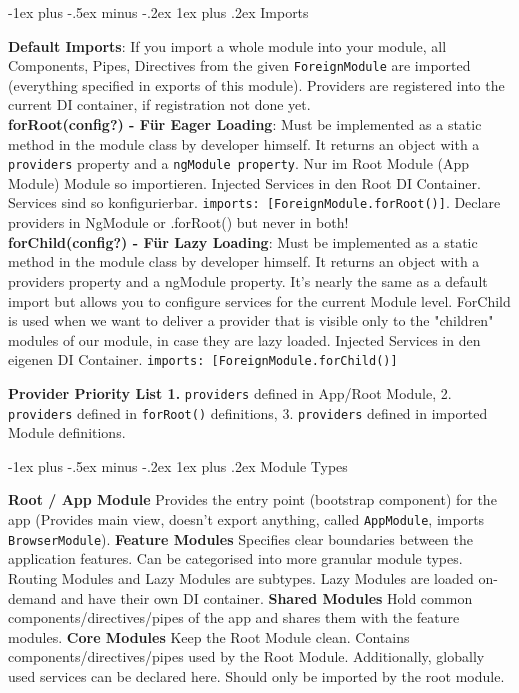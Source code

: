 \documentclass[a4paper, fontsize=6pt]{scrartcl}
\makeatletter
\renewcommand{\subsubsection}{\@startsection{subsubsection}{3}{0mm}%
    {-1ex plus -.5ex minus -.2ex}%
    {1ex plus .2ex}%
    {\normalfont\small\bfseries}}
\newcommand{\js}[1]{\texttt{#1}}
\makeatother
\begin{document}
\begin{multicols*}{5}
\subsubsection{Imports}

\textbf{Default Imports}: If you import a whole module into your module, all Components, Pipes, Directives from the given \js{ForeignModule} are imported (everything specified in exports of this module). Providers are registered into the current DI container, if registration not done yet.\\
\textbf{forRoot(config?) - Für Eager Loading}: Must be implemented as a static method in the module class by developer himself.  It returns an object with a \js{providers} property and a \js{ngModule property}. Nur im Root Module (App Module) Module so importieren. Injected Services in den Root DI Container. Services sind so konfigurierbar. \js{imports: [ForeignModule.forRoot()]}. Declare providers in NgModule or .forRoot() but never in both!\\
\textbf{forChild(config?) - Für Lazy Loading}: Must be implemented as a static method in the module class by developer himself. It returns an object with a providers property and a ngModule property. It’s nearly the same as a default import but allows you to configure services for the current Module level.
ForChild is used when we want to deliver a provider that is visible only to the "children" modules of our module, in case they are lazy loaded. Injected Services in den eigenen DI Container. \js{imports: [ForeignModule.forChild()]}

\textbf{Provider Priority List 1.} \js{providers} defined in App/Root Module, 2. \js{providers} defined in \js{forRoot()} definitions, 3. \js{providers} defined in imported Module definitions.

\subsubsection{Module Types}

\textbf{Root / App Module} Provides the entry point (bootstrap component) for the app (Provides main view, doesn’t export anything, called \js{AppModule}, imports \js{BrowserModule}).
\textbf{Feature Modules} Specifies clear boundaries between the application features. Can be categorised into more granular module types. Routing Modules and Lazy Modules are subtypes. Lazy Modules are loaded on-demand and have their own DI container.
\textbf{Shared Modules} Hold common components/directives/pipes of the app and shares them with the feature modules.
\textbf{Core Modules} Keep the Root Module clean. Contains components/directives/pipes used by the Root Module. Additionally, globally used services can be declared here. Should only be imported by the root module.



\end{multicols*}
\end{document}
